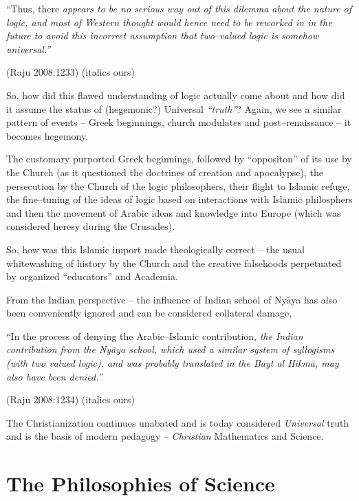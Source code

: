 \begin{myquote}
“Thus, there \textit{appears to be no serious way out of this dilemma about the nature of logic, and most of Western thought would hence need to be reworked in in the future to avoid this incorrect assumption that two–valued logic is somehow universal.”}
\end{myquote}

\hfill (Raju 2008:1233) (italics ours)

So, how did this flawed understanding of logic actually come about and how did it assume the status of (hegemonic?) Universal \textit{“truth”}? Again, we see a similar pattern of events – Greek beginnings, church modulates and post–renaissance – it becomes hegemony.

The customary purported Greek beginnings, followed by “oppositon” of its use by the Church (as it questioned the doctrines of creation and apocalypse), the persecution by the Church of the logic philosophers, their flight to Islamic refuge, the fine–tuning of the ideas of logic based on interactions with Islamic philosphers and then the movement of Arabic ideas and knowledge into Europe (which was considered heresy during the Crusades).

\newpage

So, how was this Islamic import made theologically correct – the usual whitewashing of history by the Church and the creative falsehoods perpetuated by organized “educators” and Academia.

From the Indian perspective – the influence of Indian school of Nyāya has also been conveniently ignored and can be considered collateral damage,

\begin{myquote}
“In the process of denying the Arabic–Islamic contribution, \textit{the Indian contribution from the Nyāya school, which used a similar system of syllogisms (with two valued logic), and was probably translated in the Bayt al Hikmā, may also have been denied.”}
\end{myquote}

\hfill (Raju 2008:1234) (italics ours)

The Christianization continues unabated and is today considered \textit{Universal} truth and is the basis of modern pedagogy – \textit{Christian} Mathematics and Science.


\section*{The Philosophies of Science}


